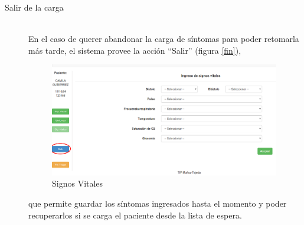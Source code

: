\begin{description}
\item[Salir de la carga]\mbox{} \\
En el caso de querer abandonar la carga de síntomas para poder retomarla más tarde, el sistema provee la acción ``Salir'' (figura \ref{fin}),
\begin{figure}
\centerline{\includegraphics[width=0.99\textwidth]{fin.png}}
\caption{Signos Vitales} \label{fig:fin}
\end{figure}
que permite guardar los síntomas ingresados hasta el momento y poder recuperarlos si se carga el paciente desde la lista de espera.


\end{description}